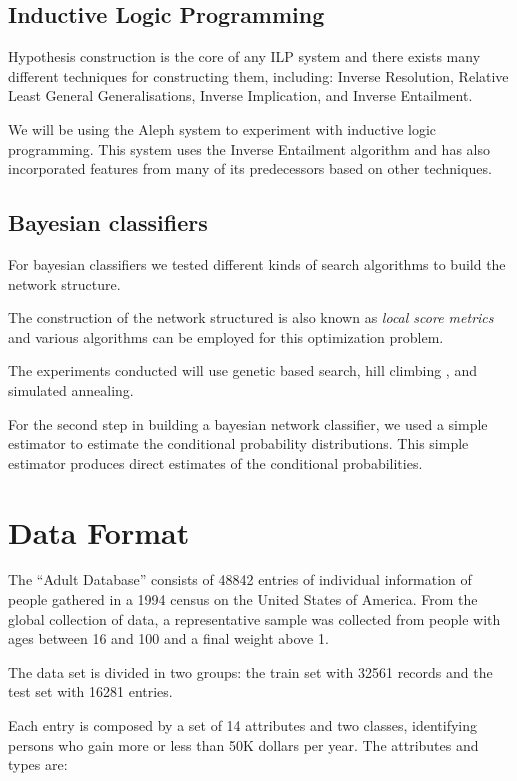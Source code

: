 \documentclass[a4paper]{llncs}
\begin{document}
\subsection{Inductive Logic Programming}

Hypothesis construction is the core of any ILP system and there exists many different techniques for constructing them, including: Inverse Resolution, Relative Least General Generalisations, Inverse Implication, and Inverse Entailment.

We will be using the Aleph system \cite{aleph} to experiment with inductive logic programming. This system
uses the Inverse Entailment algorithm and has also incorporated features from many of its predecessors based on other techniques.

\subsection{Bayesian classifiers}

For bayesian classifiers we tested different kinds of search algorithms to build
the network structure.

The construction of the network structured is also known as
\textit{local score metrics} and various algorithms can be employed for this optimization problem.

The experiments conducted will use genetic based search, hill climbing \cite{bayes3}, and simulated annealing.

For the second step in building a bayesian network classifier, we used a
simple estimator to estimate the conditional probability distributions.
This simple estimator produces
direct estimates of the conditional probabilities. \cite{bayes_weka}

\section{Data Format}

The ``Adult Database'' consists of 48842 entries of individual information of 
people gathered in a 1994 census on the United States of America. From the
global collection of data, a representative sample was collected from people
with ages between 16 and 100 and a final weight above 1.

The data set is divided in two groups: the train set with 32561 records and the test set with 16281 entries.

Each entry is composed by a set of 14 attributes and two classes, identifying
persons who gain more or less than 50K dollars per year. The attributes and types are:
\end{document}
